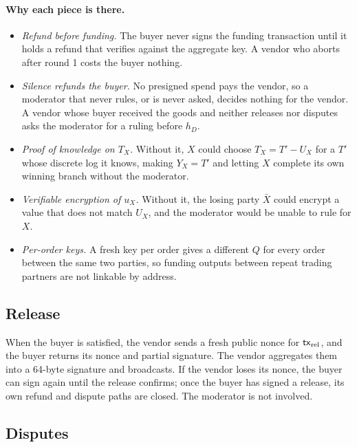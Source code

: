 \paragraph{Why each piece is there.}
\begin{itemize}
  \item \emph{Refund before funding.} The buyer never signs the funding transaction until it holds a refund that verifies against the aggregate key. A vendor who aborts after round 1 costs the buyer nothing.
  \item \emph{Silence refunds the buyer.} No presigned spend pays the vendor, so a moderator that never rules, or is never asked, decides nothing for the vendor. A vendor whose buyer received the goods and neither releases nor disputes asks the moderator for a ruling before $h_D$.
  \item \emph{Proof of knowledge on $T_X$.} Without it, $X$ could choose $T_X=T'-U_X$ for a $T'$ whose discrete log it knows, making $Y_X=T'$ and letting $X$ complete its own winning branch without the moderator.
  \item \emph{Verifiable encryption of $u_X$.} Without it, the losing party $\bar X$ could encrypt a value that does not match $U_X$, and the moderator would be unable to rule for $X$.
  \item \emph{Per-order keys.} A fresh key per order gives a different $Q$ for every order between the same two parties, so funding outputs between repeat trading partners are not linkable by address.
\end{itemize}

\subsection{Release}

When the buyer is satisfied, the vendor sends a fresh public nonce for $\mathsf{tx}_{\mathrm{rel}}$, and the buyer returns its nonce and partial signature. The vendor aggregates them into a 64-byte signature and broadcasts. If the vendor loses its nonce, the buyer can sign again until the release confirms; once the buyer has signed a release, its own refund and dispute paths are closed. The moderator is not involved.

\subsection{Disputes}

